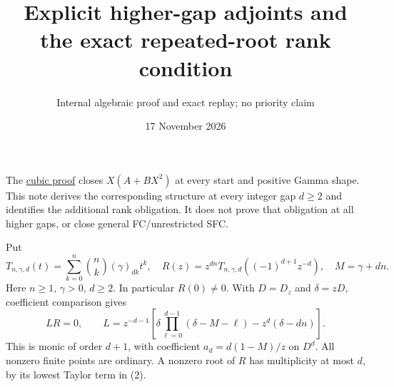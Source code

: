 \documentclass[11pt]{article}
\title{Explicit higher-gap adjoints and the exact repeated-root rank condition}
\author{Internal algebraic proof and exact replay; no priority claim}
\date{17 November 2026}
\begin{document}
\maketitle
The \href{CUBIC_ADJOINT_STABILITY_SFC.tex}{cubic proof} closes
$X(A+BX^2)$ at every start and positive Gamma shape. This note derives
the corresponding structure at every integer gap $d\ge2$ and identifies
the additional rank obligation. It does not prove that obligation at all
higher gaps, or close general FC/unrestricted SFC.

Put
\[
 T_{n,\gamma,d}(t)=\sum_{k=0}^n\binom nk(\gamma)_{dk}t^k,
 \quad R(z)=z^{dn}T_{n,\gamma,d}((-1)^{d+1}z^{-d}),\quad M=\gamma+dn.
                                                               \tag{1}
\]
Here $n\ge1$, $\gamma>0$, $d\ge2$. In particular $R(0)\ne0$.
With $D=D_z$ and $\delta=zD$, coefficient comparison gives
\[
 LR=0,\qquad
 L=z^{-d-1}\left[\delta\prod_{\ell=0}^{d-1}(\delta-M-\ell)
                        -z^d(\delta-dn)\right].               \tag{2}
\]
This is monic of order $d+1$, with coefficient
$a_d=d(1-M)/z$ on $D^d$. All nonzero finite points are ordinary.
A nonzero root of $R$ has multiplicity at most $d$, by its lowest
Taylor term in (2).
\end{document}
